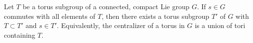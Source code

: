 Let $T$ be a torus subgroup of a connected, compact Lie group $G$. If $s \in G$ commutes with all elements of $T$, then there exists a torus subgroup $T'$ of $G$ with $T \subset T'$ and $s \in T'$. Equivalently, the centralizer of a torus in $G$ is a union of tori containing $T$.
